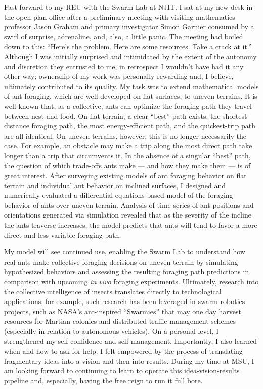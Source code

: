 Fast forward to my REU with the Swarm Lab at NJIT.
I sat at my new desk in the open-plan office after a preliminary meeting with visiting mathematics professor Jason Graham and primary investigator Simon Garnier consumed by a swirl of surprise, adrenaline, and, also, a little panic.
The meeting had boiled down to this:
``Here's the problem.
Here are some resources.
Take a crack at it.''
Although I was initially surprised and intimidated by the extent of the autonomy and discretion they entrusted to me, in retrospect I wouldn't have had it any other way;
ownership of my work was personally rewarding and, I believe, ultimately contributed to its quality.
My task was to extend mathematical models of ant foraging, which are well-developed on flat surfaces, to uneven terrains.
It is well known that, as a collective, ants can optimize the foraging path they travel between nest and food.
On flat terrain, a clear ``best'' path exists: the shortest-distance foraging path, the most energy-efficient path, and the quickest-trip path are all identical.
On uneven terrains, however, this is no longer necessarily the case.
For example, an obstacle may make a trip along the most direct path take longer than a trip that circumvents it.
In the absence of a singular ``best'' path, the question of which trade-offs ants make --- and how they make them --- is of great interest.
After surveying existing models of ant foraging behavior on flat terrain and individual ant behavior on inclined surfaces, I designed and numerically evaluated a differential equations-based model of the foraging behavior of ants over uneven terrain.
Analysis of time series of ant positions and orientations generated via simulation revealed that as the severity of the incline the ants traverse increases, the model predicts that ants will tend to favor a more direct and less variable foraging path.

My model will see continued use, enabling the Swarm Lab to understand how real ants make collective foraging decisions on uneven terrain by simulating hypothesized behaviors and assessing the resulting foraging path predictions in comparison with upcoming \textit{in vivo} foraging experiments.
Ultimately, research into the collective intelligence of insects translates directly to technological applications;
for example, such research has been leveraged in swarm robotics projects, such as NASA's ant-inspired ``Swarmies'' that may one day harvest resources for Martian colonies and distributed traffic management schemes (especially in relation to autonomous vehicles).
On a personal level, I strengthened my self-confidence and self-management.
Importantly, I also learned when and how to ask for help.
I felt empowered by the process of translating fragmentary ideas into a vision and then into results.
During my time at MSU, I am looking forward to continuing to learn to operate this idea-vision-results pipeline and, especially, having the free reign to run it full bore.
